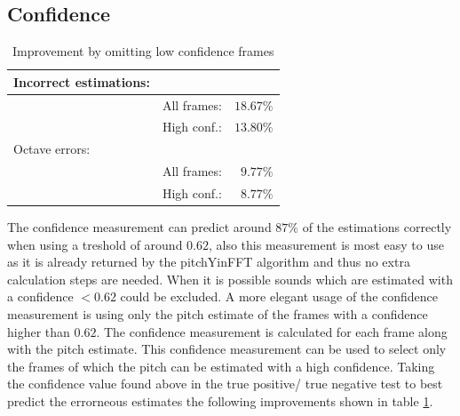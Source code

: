\documentclass{proc}
\begin{document}
\subsection{Confidence}
\begin{table}[h]
    \begin{center}
        \begin{tabular}{ | l | c | r |}
            \hline
            Incorrect estimations:  &               &               \\  \hline
                                    &   All frames: &   $18.67\%$   \\  \hline
                                    &   High conf.: &   $13.80\%$    \\  \hline
            Octave errors:      &               &               \\  \hline
                                &   All frames: &   $9.77\%$   \\  \hline
                                &   High conf.: &   $8.77\%$   \\  \hline
        \end{tabular}
        \caption{Improvement by omitting low confidence frames}
        \label{table:impr_c}
    \end{center}
\end{table}
The confidence measurement can predict around $87\%$ of the estimations correctly when using a treshold of around $0.62$, also this measurement is most easy to use as it is already returned by the pitchYinFFT algorithm and thus no extra calculation steps are needed. When it is possible sounds which are estimated with a confidence $< 0.62$ could be excluded. A more elegant usage of the confidence measurement is using only the pitch estimate of the frames with a confidence higher than $0.62$. The confidence measurement is calculated for each frame along with the pitch estimate. This confidence measurement can be used to select only the frames of which the pitch can be estimated with a high confidence. Taking the confidence value found above in the true positive/ true negative test to best predict the errorneous estimates the following improvements shown in table \ref{table:impr_c}.
\end{document}
